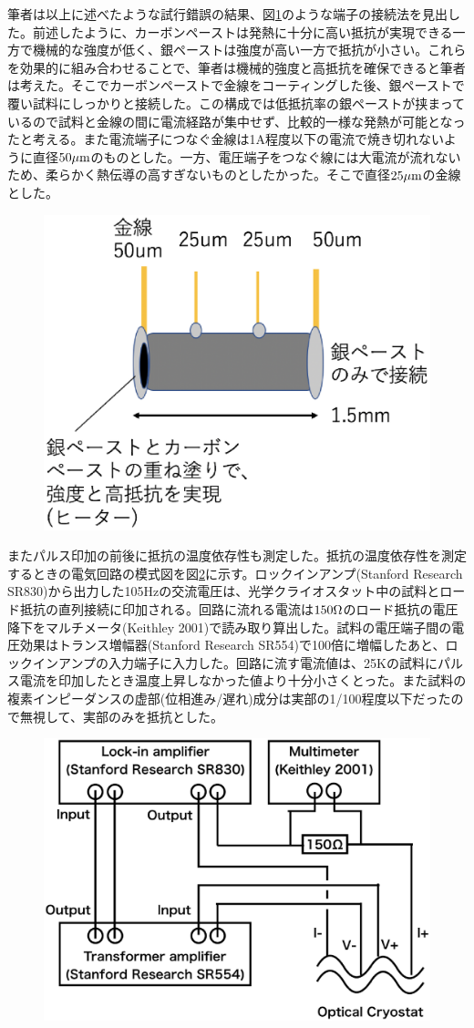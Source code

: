 筆者は以上に述べたような試行錯誤の結果、図\ref{fig:schematics_sample}のような端子の接続法を見出した。前述したように、カーボンペーストは発熱に十分に高い抵抗が実現できる一方で機械的な強度が低く、銀ペーストは強度が高い一方で抵抗が小さい。これらを効果的に組み合わせることで、筆者は機械的強度と高抵抗を確保できると筆者は考えた。そこでカーボンペーストで金線をコーティングした後、銀ペーストで覆い試料にしっかりと接続した。この構成では低抵抗率の銀ペーストが挟まっているので試料と金線の間に電流経路が集中せず、比較的一様な発熱が可能となったと考える。また電流端子につなぐ金線は1A程度以下の電流で焼き切れないように直径$\rm 50 \mu m$のものとした。一方、電圧端子をつなぐ線には大電流が流れないため、柔らかく熱伝導の高すぎないものとしたかった。そこで直径$\rm 25 \mu m$の金線とした。
\begin{figure}[!h]
    \begin{center}
   \includegraphics[width=0.4\hsize]{experiment/schematics_sample.eps}
  \end{center}
  \caption{}
  \label{fig:schematics_sample}
\end{figure}

またパルス印加の前後に抵抗の温度依存性も測定した。抵抗の温度依存性を測定するときの電気回路の模式図を図\ref{fig:schematics_lockin}に示す。ロックインアンプ(Stanford Research SR830)から出力した105Hzの交流電圧は、光学クライオスタット中の試料とロード抵抗の直列接続に印加される。回路に流れる電流は$\rm 150\Omega$のロード抵抗の電圧降下をマルチメータ(Keithley 2001)で読み取り算出した。試料の電圧端子間の電圧効果はトランス増幅器(Stanford Research SR554)で100倍に増幅したあと、ロックインアンプの入力端子に入力した。回路に流す電流値は、25Kの試料にパルス電流を印加したとき温度上昇しなかった値より十分小さくとった。また試料の複素インピーダンスの虚部(位相進み/遅れ)成分は実部の1/100程度以下だったので無視して、実部のみを抵抗とした。
\begin{figure}[!h]
     \begin{center}
   \includegraphics[width=0.5\hsize]{experiment/schematics_lockin.eps}
  \end{center}
  \caption{}
  \label{fig:schematics_lockin}
\end{figure}


